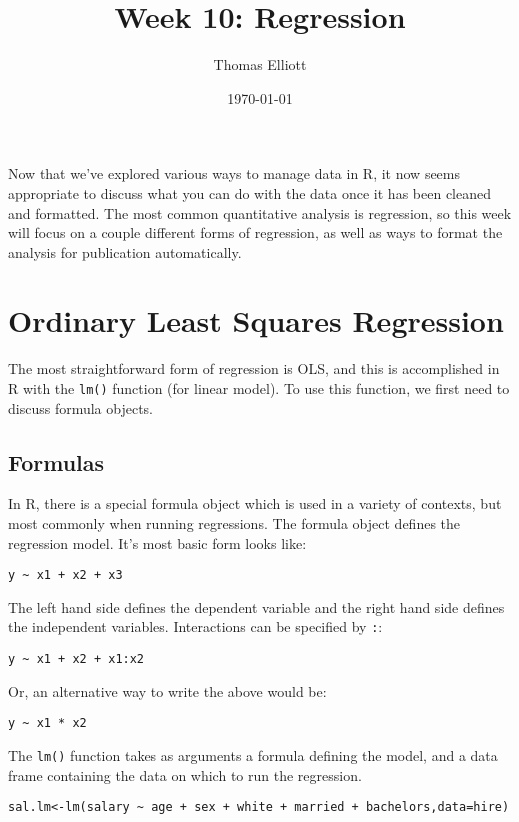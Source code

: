 \documentclass[12pt, oneside]{amsart}   	%
\title{Week 10: Regression}
\author{Thomas Elliott}
\date{\today}							%
\begin{document}
\maketitle

Now that we've explored various ways to manage data in R, it now seems appropriate to discuss what you can do with the data once it has been cleaned and formatted. The most common quantitative analysis is regression, so this week will focus on a couple different forms of regression, as well as ways to format the analysis for publication automatically.

\section{Ordinary Least Squares Regression}

The most straightforward form of regression is OLS, and this is accomplished in R with the \texttt{lm()} function (for linear model). To use this function, we first need to discuss formula objects.

\subsection{Formulas}

In R, there is a special formula object which is used in a variety of contexts, but most commonly when running regressions. The formula object defines the regression model. It's most basic form looks like:

\begin{verbatim}
y ~ x1 + x2 + x3
\end{verbatim}

The left hand side defines the dependent variable and the right hand side defines the independent variables. Interactions can be specified by \texttt{:}:

\begin{verbatim}
y ~ x1 + x2 + x1:x2
\end{verbatim}

Or, an alternative way to write the above would be:

\begin{verbatim}
y ~ x1 * x2
\end{verbatim}

The \texttt{lm()} function takes as arguments a formula defining the model, and a data frame containing the data on which to run the regression. 

\begin{verbatim}
sal.lm<-lm(salary ~ age + sex + white + married + bachelors,data=hire)
\end{verbatim}
\end{document}
